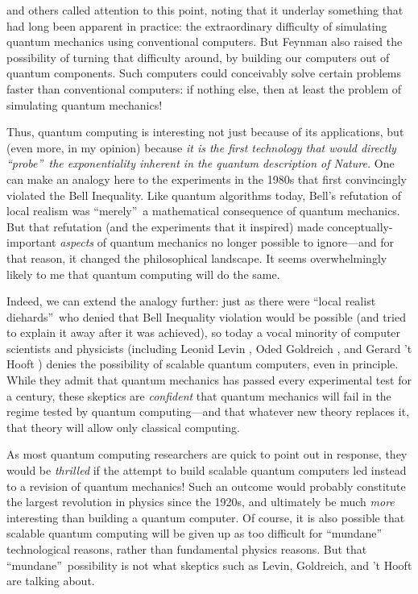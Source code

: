 \documentclass[12pt,onecolumn]{article}%
\begin{document}
\cite{feynman:qc} and others called attention to this point, noting that it
underlay something that had long been apparent in practice: the extraordinary
difficulty of simulating quantum mechanics using conventional computers. But
Feynman also raised the possibility of turning that difficulty around, by
building our computers out of quantum components. Such computers could
conceivably solve certain problems faster than conventional computers: if
nothing else, then at least the problem of simulating quantum mechanics!

Thus, quantum computing is interesting not just because of its applications,
but (even more, in my opinion) because \textit{it is the first technology that
would directly \textquotedblleft probe\textquotedblright\  the exponentiality
inherent in the quantum description of Nature.} One can make an analogy here
to the experiments in the 1980s that first convincingly violated the Bell
Inequality. Like quantum algorithms today, Bell's refutation of local
realism was \textquotedblleft merely\textquotedblright\  a mathematical
consequence of quantum mechanics. But that refutation (and the experiments
that it inspired) made conceptually-important \textit{aspects} of quantum
mechanics no longer possible to ignore---and for that reason, it changed the
philosophical landscape. It seems overwhelmingly likely to me that quantum
computing will do the same.

Indeed, we can extend the analogy further: just as there were
\textquotedblleft local realist diehards\textquotedblright\  who denied that
Bell Inequality violation would be possible (and tried to explain it away
after it was achieved), so today a vocal minority of computer scientists and
physicists (including Leonid Levin \cite{levin:qc}, Oded Goldreich
\cite{goldreich:qc}, and Gerard 't Hooft \cite{thooft}) denies the
possibility of scalable quantum computers, even in principle. While they
admit that quantum mechanics has passed every experimental test for a century,
these skeptics are \textit{confident} that quantum mechanics will fail in the
regime tested by quantum computing---and that whatever new theory replaces it,
that theory will allow only classical computing.

As most quantum computing researchers are quick to point out in response, they
would be \textit{thrilled} if the attempt to build scalable quantum computers
led instead to a revision of quantum mechanics! Such an outcome would
probably constitute the largest revolution in physics since the 1920s, and
ultimately be much \textit{more} interesting than building a quantum computer.
 Of course, it is also possible that scalable quantum computing will be given
up as too difficult for \textquotedblleft mundane\textquotedblright\ %
 technological reasons, rather than fundamental physics reasons. But that
\textquotedblleft mundane\textquotedblright\  possibility is not what skeptics
such as Levin, Goldreich, and 't Hooft are talking about.
\end{document}
